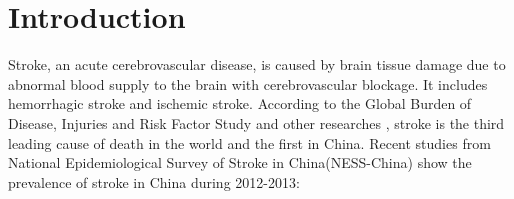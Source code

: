 \documentclass{article}
\begin{document}



\section{Introduction}\label{sec:Intro}
Stroke, an acute cerebrovascular disease, is caused by brain tissue damage due to abnormal blood supply to the brain with cerebrovascular blockage. It includes hemorrhagic stroke and ischemic stroke. According to the Global Burden of Disease, Injuries and Risk Factor Study and other researches \cite{liu2007stroke, roth2018global, zhou2019mortality}, stroke is the third leading cause of death in the world and the first in China. Recent studies from National Epidemiological Survey of Stroke in China(NESS-China) \cite{wang2017prevalence} show the prevalence of stroke in China during 2012-2013:

\begin{table}[H]
\small
\centering
{}
\caption{Prevalence of Stroke in China}
\end{table}
\end{document}
